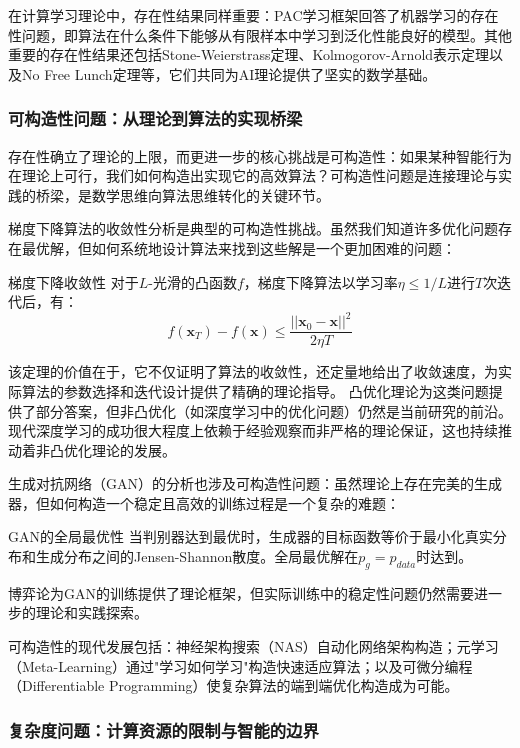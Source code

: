 在计算学习理论中，存在性结果同样重要：PAC学习框架回答了机器学习的存在性问题，即算法在什么条件下能够从有限样本中学习到泛化性能良好的模型。其他重要的存在性结果还包括Stone-Weierstrass定理、Kolmogorov-Arnold表示定理以及No Free Lunch定理等，它们共同为AI理论提供了坚实的数学基础。

\subsubsection{可构造性问题：从理论到算法的实现桥梁}

存在性确立了理论的上限，而更进一步的核心挑战是可构造性：如果某种智能行为在理论上可行，我们如何构造出实现它的高效算法？可构造性问题是连接理论与实践的桥梁，是数学思维向算法思维转化的关键环节。

梯度下降算法的收敛性分析是典型的可构造性挑战。虽然我们知道许多优化问题存在最优解，但如何系统地设计算法来找到这些解是一个更加困难的问题：

\begin{theorem}[]{梯度下降收敛性} 
对于$L$-光滑的凸函数$f$，梯度下降算法以学习率$\eta \leq 1/L$进行$T$次迭代后，有：
$$f(\mathbf{x}_T) - f(\mathbf{x}) \leq \frac{||\mathbf{x}_0 - \mathbf{x}||^2}{2\eta T}$$
\end{theorem}

该定理的价值在于，它不仅证明了算法的收敛性，还定量地给出了收敛速度，为实际算法的参数选择和迭代设计提供了精确的理论指导。
凸优化理论为这类问题提供了部分答案，但非凸优化（如深度学习中的优化问题）仍然是当前研究的前沿。现代深度学习的成功很大程度上依赖于经验观察而非严格的理论保证，这也持续推动着非凸优化理论的发展。

生成对抗网络（GAN）的分析也涉及可构造性问题：虽然理论上存在完美的生成器，但如何构造一个稳定且高效的训练过程是一个复杂的难题：

\begin{theorem}[]{GAN的全局最优性} 
当判别器达到最优时，生成器的目标函数等价于最小化真实分布和生成分布之间的Jensen-Shannon散度。全局最优解在$p_g = p_{data}$时达到。
\end{theorem}

博弈论为GAN的训练提供了理论框架，但实际训练中的稳定性问题仍然需要进一步的理论和实践探索。

可构造性的现代发展包括：神经架构搜索（NAS）自动化网络架构构造；元学习（Meta-Learning）通过"学习如何学习"构造快速适应算法；以及可微分编程（Differentiable Programming）使复杂算法的端到端优化构造成为可能。

\subsubsection{复杂度问题：计算资源的限制与智能的边界}

